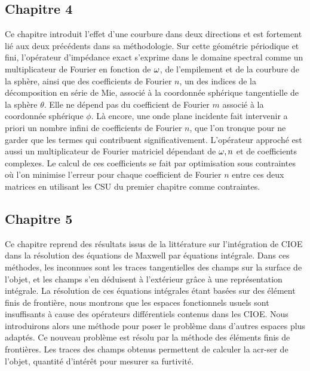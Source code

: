 \subsection*{Chapitre 4}
Ce chapitre introduit l'effet d'une courbure dans deux directions et est fortement lié aux deux précédents dans sa méthodologie.
Sur cette géométrie périodique et fini, l'opérateur d'impédance exact s'exprime dans le domaine spectral comme un multiplicateur de Fourier en fonction de \(\omega\), de l'empilement et de la courbure de la sphère, ainsi que des coefficients de Fourier \(n\), un des indices de la décomposition en série de Mie, associé à la coordonnée sphérique tangentielle de la sphère \(\theta\).
Elle ne dépend pas du coefficient de Fourier \(m\) associé à la coordonnée sphérique \(\phi\).
Là encore, une onde plane incidente fait intervenir a priori un nombre infini de coefficients de Fourier \(n\), que l'on tronque pour ne garder que les termes qui contribuent significativement.
L'opérateur approché est aussi un multiplicateur de Fourier matriciel dépendant de \(\omega, n\) et de coefficients complexes.
Le calcul de ces coefficients se fait par optimisation sous contraintes où l'on minimise l'erreur pour chaque coefficient de Fourier \(n\) entre ces deux matrices en utilisant les CSU du premier chapitre comme contraintes.

\subsection*{Chapitre 5}
Ce chapitre reprend des résultats issus de la littérature sur l'intégration de CIOE dans la résolution des équations de Maxwell par équations intégrale.
Dans ces méthodes, les inconnues sont les traces tangentielles des champs sur la surface de l'objet, et les champs s'en déduisent à l'extérieur grâce à une représentation intégrale.
La résolution de ces équations intégrales étant basées sur des élément finis de frontière, nous montrons que les espaces fonctionnels usuels sont insuffisants à cause des opérateurs différentiels contenus dans les CIOE.
Nous introduirons alors une méthode pour poser le problème dans d'autres espaces plus adaptés. Ce nouveau problème est résolu par la méthode des éléments finis de frontières. Les traces des champs obtenus permettent de calculer la \gls{acr-ser} de l'objet, quantité d'intérêt pour mesurer sa furtivité.



